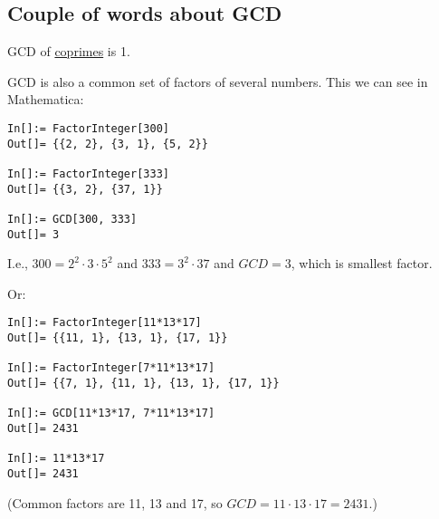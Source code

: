 \subsection{Couple of words about GCD}

GCD of \href{https://yurichev.com/blog/RSA/}{coprimes} is 1.

\myhrule{}

GCD is also a common set of factors of several numbers.
This we can see in Mathematica:

\begin{lstlisting}
In[]:= FactorInteger[300]
Out[]= {{2, 2}, {3, 1}, {5, 2}}

In[]:= FactorInteger[333]
Out[]= {{3, 2}, {37, 1}}

In[]:= GCD[300, 333]
Out[]= 3
\end{lstlisting}

I.e., $300=2^2 \cdot 3 \cdot 5^2$ and $333=3^2 \cdot 37$ and $GCD=3$, which is smallest factor.

Or:

\begin{lstlisting}
In[]:= FactorInteger[11*13*17]
Out[]= {{11, 1}, {13, 1}, {17, 1}}

In[]:= FactorInteger[7*11*13*17]
Out[]= {{7, 1}, {11, 1}, {13, 1}, {17, 1}}

In[]:= GCD[11*13*17, 7*11*13*17]
Out[]= 2431

In[]:= 11*13*17
Out[]= 2431
\end{lstlisting}

(Common factors are 11, 13 and 17, so $GCD = 11 \cdot 13 \cdot 17 = 2431$.)

